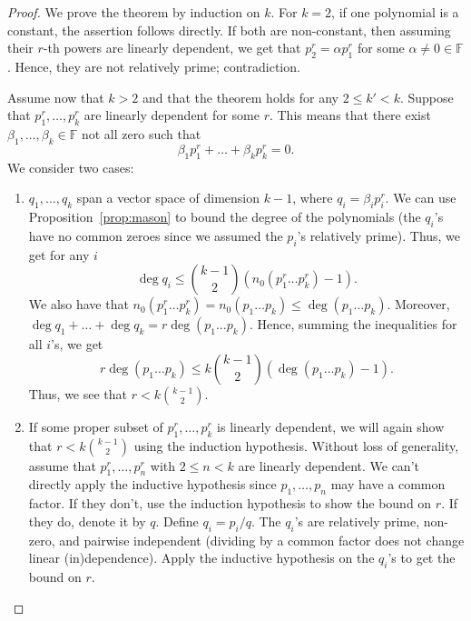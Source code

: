 \documentclass{amsart}
\theoremstyle{definition}
\theoremstyle{remark}
\numberwithin{equation}{section}
\newcommand{\F}{\mathbb{F}}
\begin{document}
\begin{proof}
	We prove the theorem by induction on $ k $. For $ k = 2 $, if one polynomial is a
	constant, the assertion follows directly. If both are non-constant, then
	assuming their $ r $-th powers are linearly dependent, we get that $ p_2^r =
	\alpha p_1^r$ for some $ \alpha \neq 0 \in \F $. Hence, they are not
	relatively prime; contradiction.

	Assume now that $ k > 2 $ and that the theorem holds for any $ 2 \leq k' < k $.
	Suppose that $ p_1^r, \ldots, p_k^r $ are linearly dependent for some $ r $.
	This means that there exist $ \beta_1, \ldots, \beta_k \in \F $ not all zero
	such that 
	\[ 
		\beta_1 p_1^r + \ldots + \beta_k p_k^r = 0. 
	\]
	We consider two cases:
	\begin{enumerate}
		\item
			$ q_1, \ldots, q_k $ span a vector space of dimension $ k-1 $, where 
			$ q_i = \beta_ip_i^r $. We can use
			Proposition~\ref{prop:mason} to bound the degree of the polynomials
			(the $ q_i $'s have no common zeroes since we assumed the $ p_i $'s
			relatively prime). Thus, we get for any $ i $
			\begin{equation*}
				\label{eq:bound}
				\deg q_i \leq  \binom{k-1}{2}  (n_0(p_1^r\ldots
				p_k^r) - 1).
			\end{equation*}
			We also have that $ n_0(p_1^r\ldots p_k^r) = n_0(p_1\ldots p_k) \leq
			\deg(p_1\ldots p_k)$. Moreover, $ \deg q_1 + \ldots + \deg q_k = r\deg
			(p_1\ldots p_k)$. Hence, summing the inequalities for all $ i $'s, we
			get
			\[ 
				r\deg (p_1\ldots p_k) \leq k  \binom{k-1}{2}  (\deg
				(p_1 \ldots p_k) - 1).
			\]
			Thus, we see that $ r <  k  \binom{k-1}{2} $.

		\item
			If some proper subset of $ p_1^r, \ldots, p_k^r $ is linearly
			dependent, we will again show that $ r < k  \binom{k-1}{2}
			$ using the induction hypothesis. Without loss of generality,
			assume that $ p_1^r, \ldots, p_n^r $ with $ 2 \leq n < k $ are
			linearly dependent. We can't directly apply the inductive hypothesis
			since $ p_1, \ldots, p_n $ may have a common factor. If they don't,
			use the induction hypothesis to show the bound on $ r $. If they do,
			denote it by $ q $. Define $ q_i = p_i/q $. The $ q_i $'s are
			relatively prime, non-zero, and pairwise independent (dividing by a
			common factor does not change linear (in)dependence). Apply the
			inductive hypothesis on the $ q_i $'s to get the bound on $ r $.
	\end{enumerate}
\end{proof}
\end{document}
